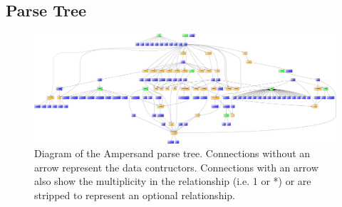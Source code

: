 \begin{landscape}

  \section*{Parse Tree}
  \label{app:parse-tree}
  \begin{figure}[htb!]
    \centering
    \includegraphics[width=25.4cm]{Figures/GenParseTree}
    \caption{Diagram of the Ampersand parse tree.\small
      Connections without an arrow represent the data contructors.
      Connections with an arrow also show the multiplicity in the relationship (i.e. 1 or *) or are stripped to represent an optional relationship.
      }
    \label{fig:parse-tree}
  \end{figure}

\end{landscape}